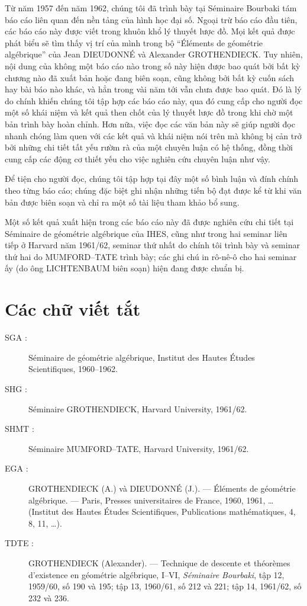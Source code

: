 \documentclass[11pt,twoside,openany]{book}
\numberwithin{equation}{section}
\newcommand{\src}[1]{%
  \phantomsection\hypertarget{src:\fgasourceid:#1}{}%
  \marginpar{\raggedleft\footnotesize\sffamily #1}%
}
\newcommand{\fgasourceid}{unset}
\begin{document}
Từ năm 1957 đến năm 1962, chúng tôi đã trình bày tại Séminaire Bourbaki tám
báo cáo liên quan đến nền tảng của hình học đại số. Ngoại trừ báo cáo đầu
tiên, các báo cáo này được viết trong khuôn khổ lý thuyết lược đồ. Mọi kết quả
được phát biểu sẽ tìm thấy vị trí của mình trong bộ ``Éléments de géométrie
algébrique'' của Jean DIEUDONNÉ và Alexander GROTHENDIECK. Tuy nhiên, nội dung
của không một báo cáo nào trong số này hiện được bao quát bởi bất kỳ chương
nào đã xuất bản hoặc đang biên soạn, cũng không bởi bất kỳ cuốn sách hay bài
báo nào khác, và hẳn trong vài năm tới vẫn chưa được bao quát. Đó là lý do
chính khiến chúng tôi tập hợp các báo cáo này, qua đó cung cấp cho người đọc
một số khái niệm và kết quả then chốt của lý thuyết lược đồ trong khi chờ một
bản trình bày hoàn chỉnh. Hơn nữa, việc đọc các văn bản này sẽ giúp người đọc
nhanh chóng làm quen với các kết quả và khái niệm nói trên mà không bị cản trở
bởi những chi tiết tất yếu rườm rà của một chuyên luận có hệ thống, đồng thời
cung cấp các động cơ thiết yếu cho việc nghiên cứu chuyên luận như vậy.

Để tiện cho người đọc, chúng tôi tập hợp tại đây một số bình luận và đính
chính theo từng báo cáo; chúng đặc biệt ghi nhận những tiến bộ đạt được kể từ
khi văn bản được biên soạn và chỉ ra một số tài liệu tham khảo bổ sung.

Một số kết quả xuất hiện trong các báo cáo này đã được nghiên cứu chi tiết tại
Séminaire de géométrie algébrique của IHES, cũng như trong hai seminar liên
tiếp ở Harvard năm 1961/62, seminar thứ nhất do chính tôi trình bày và seminar
thứ hai do MUMFORD--TATE trình bày; các ghi chú in rô-nê-ô cho hai seminar ấy
(do ông LICHTENBAUM biên soạn) hiện đang được chuẩn bị.

\section*{Các chữ viết tắt}

\begin{description}
\item[SGA :] Séminaire de géométrie algébrique, Institut des Hautes Études
Scientifiques, 1960--1962.

\src{298}
\item[SHG :] Séminaire GROTHENDIECK, Harvard University, 1961/62.

\item[SHMT :] Séminaire MUMFORD--TATE, Harvard University, 1961/62.

\item[EGA :] GROTHENDIECK (A.) và DIEUDONNÉ (J.). --- Éléments de géométrie
algébrique. --- Paris, Presses universitaires de France, 1960, 1961, …
(Institut des Hautes Études Scientifiques, Publications mathématiques, 4, 8,
11, …).

\item[TDTE :] GROTHENDIECK (Alexander). --- Technique de descente et théorèmes
d'existence en géométrie algébrique, I--VI, \emph{Séminaire Bourbaki}, tập 12,
1959/60, số 190 và 195; tập 13, 1960/61, số 212 và 221; tập 14, 1961/62, số
232 và 236.
\end{description}

\par
\end{document}
